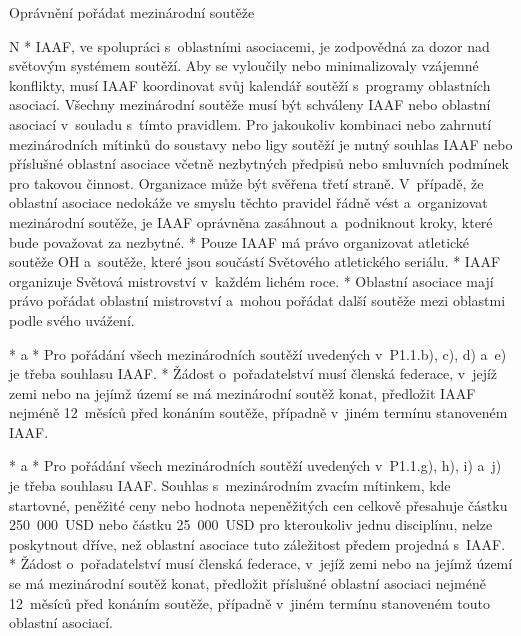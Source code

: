 \secc Oprávnění pořádat mezinárodní soutěže

\begitems \style N
* IAAF, ve spolupráci s~oblastními asociacemi, je zodpovědná za dozor nad světovým systémem soutěží. Aby se vyloučily nebo minimalizovaly vzájemné konflikty, musí IAAF koordinovat svůj kalendář soutěží s~programy oblastních asociací. Všechny mezinárodní soutěže musí být schváleny IAAF nebo oblastní asociací v~souladu s~tímto pravidlem. Pro jakoukoliv kombinaci nebo zahrnutí mezinárodních mítinků do soustavy nebo ligy soutěží je nutný souhlas IAAF nebo příslušné oblastní asociace včetně nezbytných předpisů nebo smluvních podmínek pro takovou činnost. Organizace může být svěřena třetí straně. V~případě, že oblastní asociace nedokáže ve smyslu těchto pravidel řádně vést a~organizovat mezinárodní soutěže, je IAAF oprávněna zasáhnout a~podniknout kroky, které bude považovat za nezbytné.
* Pouze IAAF má právo organizovat atletické soutěže OH a~soutěže, které jsou součástí Světového atletického seriálu.
* IAAF organizuje Světová mistrovství v~každém lichém roce.
* Oblastní asociace mají právo pořádat oblastní mistrovství a~mohou pořádat další soutěže mezi oblastmi podle svého uvážení.


* \begitems \style a
  * Pro pořádání všech mezinárodních soutěží uvedených v~P1.1.b), c), d) a~e) je třeba souhlasu IAAF.
  * Žádost o~pořadatelství musí členská federace, v~jejíž zemi nebo na jejímž území se má mezinárodní soutěž konat, předložit IAAF nejméně 12~měsíců před konáním soutěže, případně v~jiném termínu stanoveném IAAF.
  \enditems


* \begitems \style a
  * Pro pořádání všech mezinárodních soutěží uvedených v~P1.1.g), h), i) a~j) je třeba souhlasu IAAF. Souhlas s~mezinárodním zvacím mítinkem, kde startovné, peněžité ceny nebo hodnota nepeněžitých cen celkově přesahuje částku 250~000~USD nebo částku 25~000~USD pro kteroukoliv jednu disciplínu, nelze poskytnout dříve, než oblastní asociace tuto záležitost předem projedná s~IAAF.
  * Žádost o~pořadatelství musí členská federace, v~jejíž zemi nebo na jejímž území se má mezinárodní soutěž konat, předložit příslušné oblastní asociaci nejméně 12~měsíců před konáním soutěže, případně v~jiném termínu stanoveném touto oblastní asociací.
  \enditems


